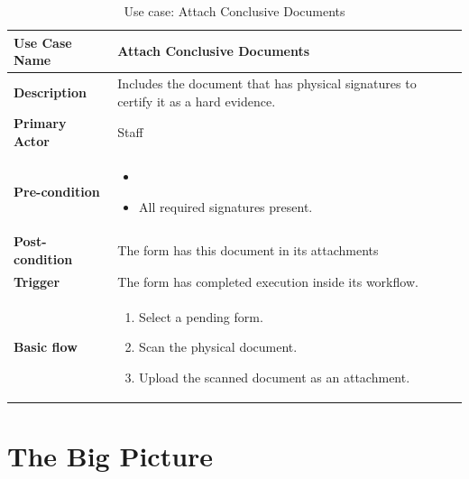 \begin{table}
	\centering
	\caption{Use case: Attach Conclusive Documents}
	\label{tbl-usecase:attach-conclusive-documents}
	\begin{tabular}{|l|L{9cm}|}
		\hline
		\textbf{Use Case Name} & Attach Conclusive Documents \\
		\hline
		
		\textbf{Description} & Includes the document that has physical signatures to certify it as a hard evidence. \\
		\textbf{Primary Actor} & Staff \\
		\textbf{Pre-condition} & 
		\begin{itemize}
			\item \alreadylogin
			\item All required signatures present.
		\end{itemize} \\
		
		\textbf{Post-condition} & The form has this document in its attachments \\
		\textbf{Trigger} & The form has completed execution inside its workflow. \\
		\textbf{Basic flow} & 
		\begin{enumerate}
			\item Select a pending form.
			\item Scan the physical document.
			\item Upload the scanned document as an attachment.
		\end{enumerate} \\
		\hline
	\end{tabular}
\end{table}

\section{The Big Picture}



